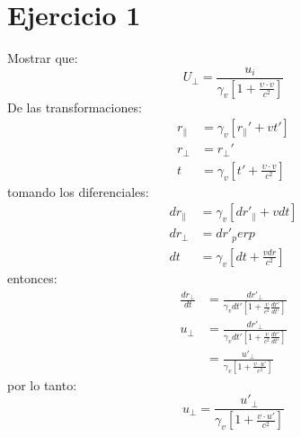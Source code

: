 \section*{Ejercicio 1}
Mostrar que:
\begin{equation*}
    U_\perp=\frac{u_i}{\gamma_v \left[1+\frac{\upsilon \cdot v}{c^2} \right]}
\end{equation*}
De las transformaciones:
\begin{align*}
    r_\parallel &= \gamma_v [{r_\parallel}'+v{t}']\\
    r_\perp &= {r_\perp}'\\
    t&= \gamma_v \left[ {t}'+\frac{\upsilon \cdot v}{c^2}\right]
\end{align*}
tomando los diferenciales:
\begin{align*}
    dr_\parallel &= \gamma_v \left[{dr}'_\parallel + vdt\right]\\
    dr_\perp &= {dr}'_perp\\
    dt&=\gamma_v \left[dt+ \frac{vdr}{c^2} \right]
\end{align*}
entonces:
\begin{align*}
    \frac{dr_\perp}{dt}&= \frac{{dr}'_\perp}{\gamma_v {dt}'\left[1+\frac{v}{c^2} \frac{{dr}'}{{dt}'} \right]}\\
    u_\perp&= \frac{{dr}'_\perp}{\gamma_v {dt}' \left[1+\frac{v}{c^2}\frac{{dr}'}{{dt}'} \right]}\\
    & = \frac{{u}'_\perp}{\gamma_v \left[1+\frac{v\cdot {u}'}{c^2} \right]}
\end{align*}
por lo tanto:
\begin{equation*}
    u_\perp = \frac{{u}'_\perp}{\gamma_v \left[1+\frac{v\cdot {u}'}{c^2} \right]}
\end{equation*}